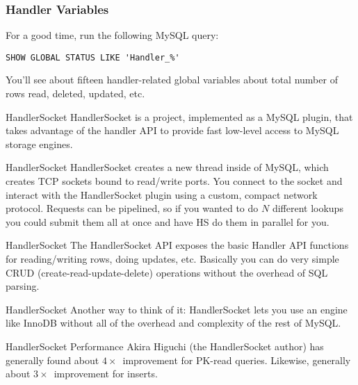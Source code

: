 \documentclass[14pt]{beamer}
\begin{document}
\begin{frame}[fragile]
  \frametitle{Handler Variables}
  For a good time, run the following MySQL query:
\begin{verbatim}
SHOW GLOBAL STATUS LIKE 'Handler_%'
\end{verbatim}
  You'll see about fifteen handler-related global variables about total number
  of rows read, deleted, updated, etc.
\end{frame}

\begin{frame}{HandlerSocket}
  HandlerSocket is a project, implemented as a MySQL plugin, that takes
  advantage of the handler API to provide fast low-level access to MySQL storage
  engines.
\end{frame}

\begin{frame}{HandlerSocket}
  HandlerSocket creates a new thread inside of MySQL, which creates TCP sockets
  bound to read/write ports.
  \newline
  \newline
  You connect to the socket and interact with the HandlerSocket plugin using a
  custom, compact network protocol. Requests can be pipelined, so if you wanted
  to do $N$ different lookups you could submit them all at once and have HS do
  them in parallel for you.
\end{frame}

\begin{frame}{HandlerSocket}
  The HandlerSocket API exposes the basic Handler API functions for
  reading/writing rows, doing updates, etc.
  \newline
  \newline
  Basically you can do very simple CRUD (create-read-update-delete) operations
  without the overhead of SQL parsing.
\end{frame}

\begin{frame}{HandlerSocket}
  Another way to think of it: HandlerSocket lets you use an engine like InnoDB
  without all of the overhead and complexity of the rest of MySQL.
\end{frame}

\begin{frame}{HandlerSocket Performance}
  Akira Higuchi (the HandlerSocket author) has generally found about
  $4\times$~improvement for PK-read queries.
  \newline
  \newline
  Likewise, generally about $3\times$~improvement for inserts.
\end{frame}
\end{document}
